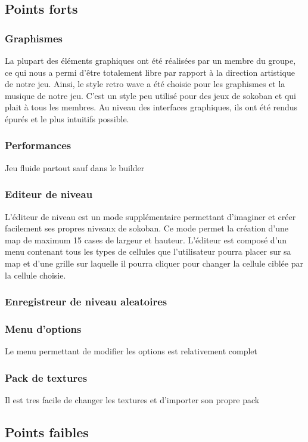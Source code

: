 \documentclass[../main.tex]{subfiles}
\begin{document}
\subsection{Points forts}
\subsubsection{Graphismes}
La plupart des éléments graphiques ont été réalisées par un membre du groupe, ce qui nous a permi d'être totalement libre
par rapport à la direction artistique de notre jeu.
Ainsi, le style retro wave a été choisie pour les graphismes et la musique de notre jeu.
C'est un style peu utilisé pour des jeux de sokoban et qui plait à tous les membres.
Au niveau des interfaces graphiques, ils ont été rendus épurés et le plus intuitifs possible.	

\subsubsection{Performances}
Jeu fluide partout sauf dans le builder

\subsubsection{Editeur de niveau}
L'éditeur de niveau est un mode supplémentaire permettant d'imaginer et créer facilement ses propres niveaux de sokoban.
Ce mode permet la création d'une map de maximum 15 cases de largeur et hauteur. 
L'éditeur est composé d'un menu contenant tous les types de cellules que l'utilisateur pourra placer sur sa map et d'une grille sur laquelle
il pourra cliquer pour changer la cellule ciblée par la cellule choisie.
\subsubsection{Enregistreur de niveau aleatoires}
\subsubsection{Menu d'options}
Le menu permettant de modifier les options est relativement complet
\subsubsection{Pack de textures}
Il est tres facile de changer les textures et d'importer son propre pack

\subsection{Points faibles}
\end{document}
